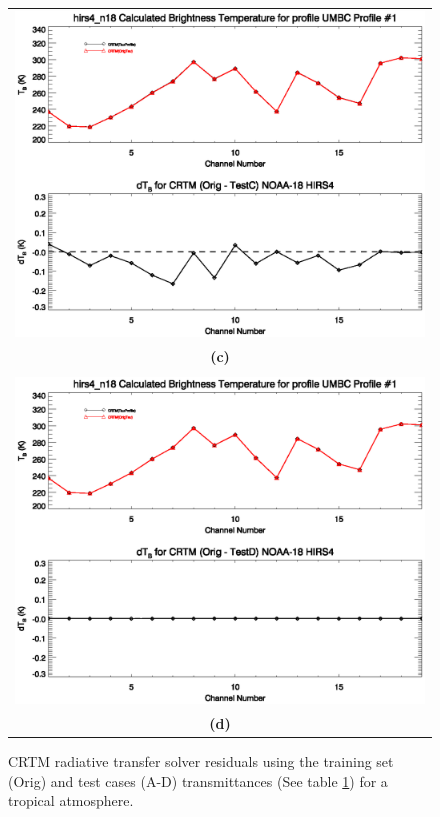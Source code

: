 \begin{figure}[htp]
\begin{tabular}{c}
    \includegraphics[bb=80 249 572 395,clip,scale=0.8]{./graphics/LBLRTM_TC.eps}\\
    {\sffamily\textbf{(c)}}\\\\
    \includegraphics[bb=80 228 572 395,clip,scale=0.8]{./graphics/LBLRTM_TD.eps}\\
    {\sffamily\textbf{(d)}}\\
  \end{tabular}
  \caption{CRTM radiative transfer solver residuals using the training set (Orig) and test cases (A-D) transmittances
  (See table \ref{fig:CRTM_Comparisons}) for a tropical atmosphere.}
  \label{fig:CRTM_Comparisons}
\end{figure}

